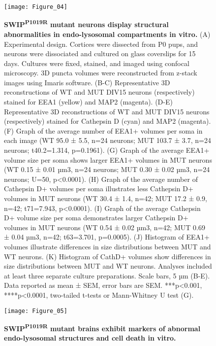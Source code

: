 \begin{figure}[!ht]
	\begin{fullwidth}
	\begin{center}
	\texttt{[image: Figure\_04]}
	\caption{\textbf{SWIP\textsuperscript{P1019R} mutant neurons display structural abnormalities in
		endo-lysosomal compartments in vitro.}
		(A) Experimental design. Cortices were dissected from P0 pups, and neurons were
		dissociated and cultured on glass coverslips for 15 days. Cultures were fixed,
		stained, and imaged using confocal microscopy. 3D puncta volumes were
		reconstructed from z-stack images using Imaris software. 
		(B-C) Representative 3D reconstructions of WT and MUT DIV15 neurons
		(respectively) stained for EEA1 (yellow) and MAP2 (magenta). 
		(D-E) Representative 3D reconstructions of WT and MUT DIV15 neurons
		(respectively) stained for Cathepsin D (cyan) and MAP2 (magenta). 
		(F) Graph of the average number of EEA1+ volumes per soma in each image (WT 95.0
		± 5.5, n=24 neurons; MUT 103.7 ± 3.7, n=24 neurons; t40.2=1.314, p=0.1961). 
		(G) Graph of the average EEA1+ volume size per soma shows larger EEA1+ volumes
		in MUT neurons (WT 0.15 ± 0.01 µm3, n=24 neurons; MUT 0.30 ± 0.02 µm3, n=24
		neurons; U=50, p<0.0001). 
		(H) Graph of the average number of Cathepsin D+ volumes per soma illustrates
		less Cathepsin D+ volumes in MUT neurons (WT 30.4 ± 1.4, n=42; MUT 17.2 ± 0.9,
		n=42; t71=7.943, p<0.0001). 
		(I) Graph of the average Cathepsin D+ volume size per soma demonstrates larger
		Cathepsin D+ volumes in MUT neurons (WT 0.54 ± 0.02 µm3, n=42; MUT 0.69 ± 0.04
		µm3, n=42; t63=3.701, p=0.0005). 
		(J) Histogram of EEA1+ volumes illustrate differences in size distributions
		between MUT and WT neurons. 
		(K) Histogram of CathD+ volumes show differences in size distributions between
		MUT and WT neurons. Analyses included at least three separate culture
		preparations. Scale bars, 5 µm (B-E). Data reported as mean ± SEM, error bars
		are SEM. ***p<0.001, ****p<0.0001, two-tailed t-tests or Mann-Whitney U test (G).
		}
	\label{fig:fig4}
	\end{center}
	\end{fullwidth}
\end{figure}


\begin{figure}[!ht]
	\begin{fullwidth}
	\begin{center}
	\captionsetup{labelformat=empty}
	\texttt{[image: Figure\_05]}
	\caption{\textbf{SWIP\textsuperscript{P1019R} mutant brains exhibit
		markers of abnormal endo-lysosomal structures and cell death in
		vitro.}}
	\end{center}
	\end{fullwidth}
\end{figure}

